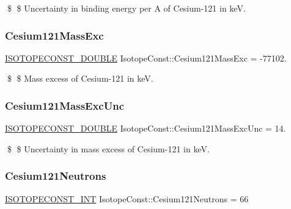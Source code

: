 \$ \$ Uncertainty in binding energy per A of Cesium-\/121 in keV. \mbox{\label{group___isotope_const-_cesium-_cs121_gab49a0d1154b675fb97f2ef593cdf37b1}} 
\subsubsection{\texorpdfstring{Cesium121\+Mass\+Exc}{Cesium121MassExc}}
{\footnotesize\ttfamily \mbox{\hyperlink{group___isotope_const-_macros_ga8f45a7272ce02c0b4c65c44636ed719a}{I\+S\+O\+T\+O\+P\+E\+C\+O\+N\+S\+T\+\_\+\+D\+O\+U\+B\+LE}} Isotope\+Const\+::\+Cesium121\+Mass\+Exc = -\/77102.}

\$ \$ Mass excess of Cesium-\/121 in keV. \mbox{\label{group___isotope_const-_cesium-_cs121_ga0b20beb620ede25dec436eceb5921e24}} 
\subsubsection{\texorpdfstring{Cesium121\+Mass\+Exc\+Unc}{Cesium121MassExcUnc}}
{\footnotesize\ttfamily \mbox{\hyperlink{group___isotope_const-_macros_ga8f45a7272ce02c0b4c65c44636ed719a}{I\+S\+O\+T\+O\+P\+E\+C\+O\+N\+S\+T\+\_\+\+D\+O\+U\+B\+LE}} Isotope\+Const\+::\+Cesium121\+Mass\+Exc\+Unc = 14.}

\$ \$ Uncertainty in mass excess of Cesium-\/121 in keV. \mbox{\label{group___isotope_const-_cesium-_cs121_ga984da4274ee300ebb7b340c36fc99de2}} 
\subsubsection{\texorpdfstring{Cesium121\+Neutrons}{Cesium121Neutrons}}
{\footnotesize\ttfamily \mbox{\hyperlink{group___isotope_const-_macros_ga5f18360b3e99483a35c32d789e62621c}{I\+S\+O\+T\+O\+P\+E\+C\+O\+N\+S\+T\+\_\+\+I\+NT}} Isotope\+Const\+::\+Cesium121\+Neutrons = 66}

